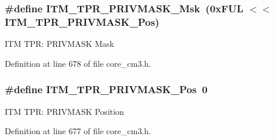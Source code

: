 \subsubsection[{\texorpdfstring{I\+T\+M\+\_\+\+T\+P\+R\+\_\+\+P\+R\+I\+V\+M\+A\+S\+K\+\_\+\+Msk}{ITM_TPR_PRIVMASK_Msk}}]{\setlength{\rightskip}{0pt plus 5cm}\#define I\+T\+M\+\_\+\+T\+P\+R\+\_\+\+P\+R\+I\+V\+M\+A\+S\+K\+\_\+\+Msk~(0x\+F\+U\+L $<$$<$ I\+T\+M\+\_\+\+T\+P\+R\+\_\+\+P\+R\+I\+V\+M\+A\+S\+K\+\_\+\+Pos)}\hypertarget{group__CMSIS__ITM_ga168e089d882df325a387aab3a802a46b}{}\label{group__CMSIS__ITM_ga168e089d882df325a387aab3a802a46b}
I\+TM T\+PR\+: P\+R\+I\+V\+M\+A\+SK Mask 

Definition at line 678 of file core\+\_\+cm3.\+h.

\subsubsection[{\texorpdfstring{I\+T\+M\+\_\+\+T\+P\+R\+\_\+\+P\+R\+I\+V\+M\+A\+S\+K\+\_\+\+Pos}{ITM_TPR_PRIVMASK_Pos}}]{\setlength{\rightskip}{0pt plus 5cm}\#define I\+T\+M\+\_\+\+T\+P\+R\+\_\+\+P\+R\+I\+V\+M\+A\+S\+K\+\_\+\+Pos~0}\hypertarget{group__CMSIS__ITM_ga7abe5e590d1611599df87a1884a352e8}{}\label{group__CMSIS__ITM_ga7abe5e590d1611599df87a1884a352e8}
I\+TM T\+PR\+: P\+R\+I\+V\+M\+A\+SK Position 

Definition at line 677 of file core\+\_\+cm3.\+h.

